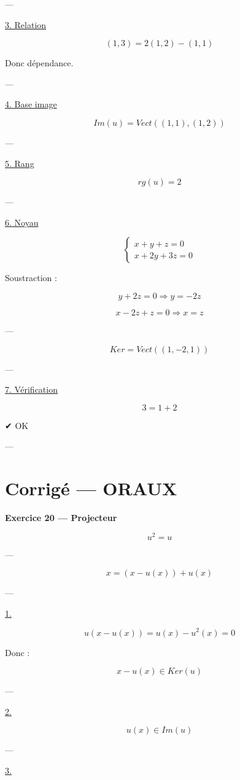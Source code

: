 \documentclass[11pt,a4paper]{article}
\begin{document}
---

\underline{3. Relation}

\[
(1,3)=2(1,2)-(1,1)
\]

Donc dépendance.

---

\underline{4. Base image}

\[
\boxed{Im(u)=Vect((1,1),(1,2))}
\]

---

\underline{5. Rang}

\[
\boxed{rg(u)=2}
\]

---

\underline{6. Noyau}

\[
\begin{cases}
x+y+z=0 \\
x+2y+3z=0
\end{cases}
\]

Soustraction :

\[
y+2z=0 \Rightarrow y=-2z
\]

\[
x -2z + z = 0 \Rightarrow x=z
\]

---

\[
\boxed{Ker = Vect((1,-2,1))}
\]

---

\underline{7. Vérification}

\[
3 = 1 + 2
\]

✔ OK

---

\section{Corrigé — ORAUX}

\textbf{Exercice 20 — Projecteur}

\[
u^2=u
\]

---

\[
x=(x-u(x)) + u(x)
\]

---

\underline{1.}

\[
u(x-u(x))=u(x)-u^2(x)=0
\]

Donc :

\[
x-u(x)\in Ker(u)
\]

---

\underline{2.}

\[
u(x)\in Im(u)
\]

---

\underline{3.}
\end{document}
